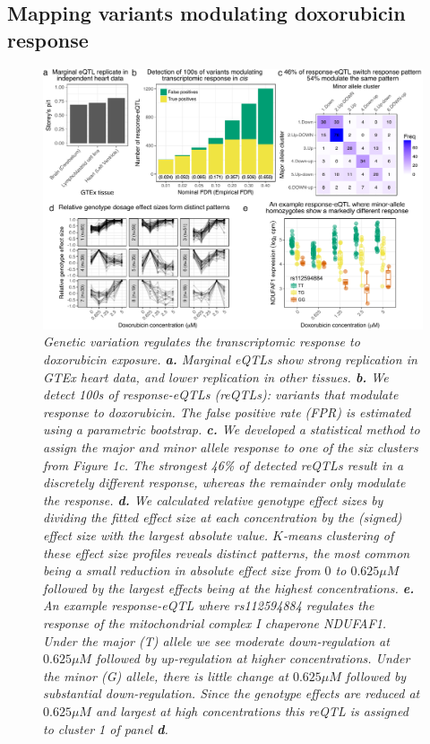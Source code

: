 \documentclass{article}
\begin{document}
{\subsection*{Mapping variants modulating doxorubicin response}

\begin{figure}
\begin{center}
    \includegraphics[width=1\textwidth]{../figures/fig2.pdf}     \caption{\it{Genetic variation regulates the transcriptomic response to doxorubicin exposure. \textbf{a.} Marginal eQTLs show strong replication in GTEx heart data, and lower replication in other tissues. \textbf{b.} We detect 100s of response-eQTLs (reQTLs): variants that modulate response to doxorubicin. The false positive rate (FPR) is estimated using a parametric bootstrap. \textbf{c.} We developed a statistical method to assign the major and minor allele response to one of the six clusters from Figure 1c. The strongest 46\% of detected reQTLs result in a discretely different response, whereas the remainder only modulate the response. \textbf{d.} We calculated relative genotype effect sizes by dividing the fitted effect size at each concentration by the (signed) effect size with the largest absolute value. $K$-means clustering of these effect size profiles reveals distinct patterns, the most common being a small reduction in absolute effect size from $0$ to $0.625\mu M$ followed by the largest effects being at the highest concentrations. \textbf{e.} An example response-eQTL where rs112594884 regulates the response of the mitochondrial complex I chaperone NDUFAF1. Under the major (T) allele we see moderate down-regulation at $0.625\mu M$ followed by up-regulation at higher concentrations. Under the minor (G) allele, there is little change at $0.625\mu M$ followed by substantial down-regulation. Since the genotype effects are reduced at $0.625\mu M$ and largest at high concentrations this reQTL is assigned to cluster 1 of panel \textbf{d}.}}
    \label{fig2}
    \end{center}
\end{figure}

}
\end{document}
